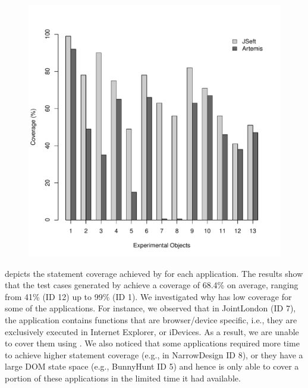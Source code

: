 \begin{figure}[!t]
  \centering
  \includegraphics[width=0.7\hsize]{r-scripts/barplot_coverage}
  \label{Fig:coverage-graph}
\end{figure}


 depicts the statement coverage achieved by \tool for each application. The results show that the test cases generated by \tool achieve a coverage of 68.4\% on average, ranging from 41\% (ID 12) up to 99\% (ID 1).
We investigated why \tool has low coverage for some of the applications. For instance, we observed that in JointLondon (ID 7), the application contains \javascript functions that are browser/device specific, i.e., they are exclusively executed in Internet Explorer, or iDevices. As a result, we are unable to cover them using \tool. 
We also noticed that some applications required more time to achieve higher statement coverage (e.g., in NarrowDesign ID 8), or they have a large DOM state space (e.g., BunnyHunt ID 5) and hence \tool is only able to cover a portion of these applications in the limited time it had available.

